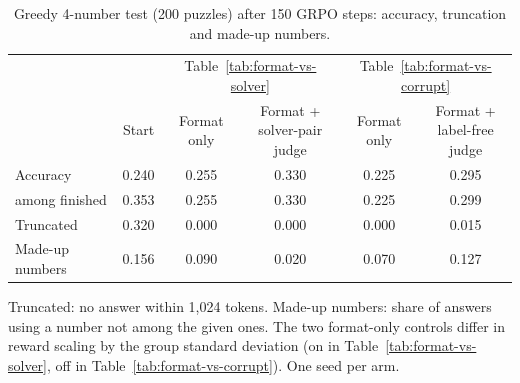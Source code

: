 \begin{table}[H]
\centering
\caption{Greedy 4-number test (200 puzzles) after 150 GRPO steps: accuracy, truncation and made-up numbers.}
\label{tab:greedy-failures}
\begin{threeparttable}
\begin{tabular}{lccccc}
\toprule
 & & \multicolumn{2}{c}{Table~\ref{tab:format-vs-solver}} & \multicolumn{2}{c}{Table~\ref{tab:format-vs-corrupt}} \\
\cmidrule(lr){3-4}\cmidrule(lr){5-6}
 & Start & Format only & \makecell{Format +\\ solver-pair judge} & Format only & \makecell{Format +\\ label-free judge} \\
\midrule
Accuracy & 0.240 & 0.255 & 0.330 & 0.225 & 0.295 \\
\quad among finished & 0.353 & 0.255 & 0.330 & 0.225 & 0.299 \\
Truncated & 0.320 & 0.000 & 0.000 & 0.000 & 0.015 \\
Made-up numbers & 0.156 & 0.090 & 0.020 & 0.070 & 0.127 \\
\bottomrule
\end{tabular}
\begin{tablenotes}\footnotesize
\item Truncated: no answer within 1,024 tokens. Made-up numbers: share of answers using a number not among the given ones. The two format-only controls differ in reward scaling by the group standard deviation (on in Table~\ref{tab:format-vs-solver}, off in Table~\ref{tab:format-vs-corrupt}). One seed per arm.
\end{tablenotes}
\end{threeparttable}
\end{table}
